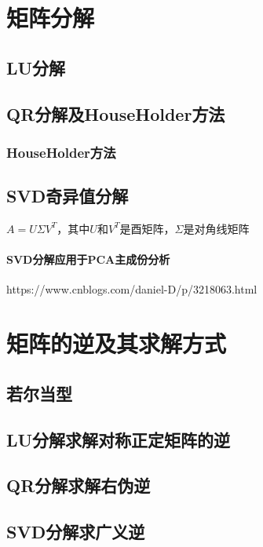 \chapter{矩阵分解}\label{MathTools:chap:matrix_decomposition}
\section{LU分解}\label{MathTools:sec:lu_decomposition}
\section{QR分解及HouseHolder方法}\label{MathTools:sec:qr_decomposition}
\subsection{HouseHolder方法}\label{MathTools:sec:householder}
\section{SVD奇异值分解}\label{MathTools:sec:svd}
\begin{theorembox}
	$A = U\Sigma V^T$，其中$U$和$V^T$是酉矩阵，$\Sigma$是对角线矩阵
\end{theorembox}
\subsubsection{SVD分解应用于PCA主成份分析}
https://www.cnblogs.com/daniel-D/p/3218063.html
\chapter{矩阵的逆及其求解方式}\label{MathTools:chap:matrix_inverse}
\section{若尔当型}
\section{LU分解求解对称正定矩阵的逆}\label{MathTools:sec:lu_inverse}
\section{QR分解求解右伪逆}\label{MathTools:sec:qr_pseudoinverse}
\section{SVD分解求广义逆}\label{MathTools:sec:svd_pseudoinverse}

